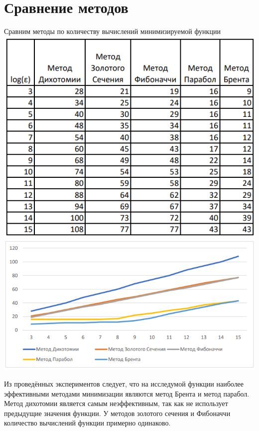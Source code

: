\documentclass[a4paper,12pt]{article}
\begin{document}
\section{Сравнение методов}
Сравним методы по количеству вычислений минимизируемой функции
\includegraphics[width=\linewidth]{table_comp1.PNG}
\includegraphics[width=\linewidth]{table_comp2.PNG}

Из проведённых экспериментов следует, что на исследумой функции наиболее эффективными методами минимизации являются метод Брента и метод парабол. 
Метод дихотомии является самым неэффективным, так как не использует предыдущие значения функции.
У методов золотого сечения и Фибоначчи количество вычислений функции примерно одинаково.
\end{document}
